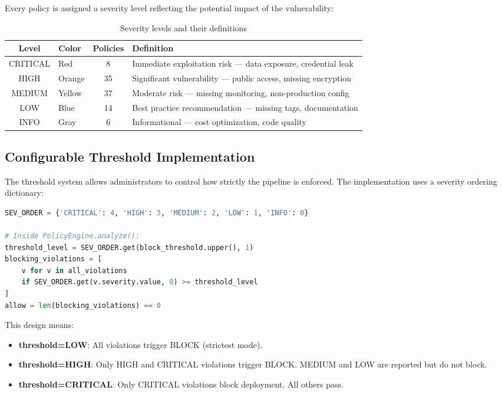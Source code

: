 Every policy is assigned a severity level reflecting the potential impact of the vulnerability:

\begin{table}[H]
\centering
\caption{Severity levels and their definitions}
\label{tab:severity-levels}
\begin{tabular}{|c|p{3cm}|c|p{6cm}|}
\hline
\textbf{Level} & \textbf{Color} & \textbf{Policies} & \textbf{Definition} \\
\hline
\cellcolor{red!20}CRITICAL & \cellcolor{red!20}Red & 8 & Immediate exploitation risk — data exposure, credential leak \\
\hline
\cellcolor{orange!20}HIGH & \cellcolor{orange!20}Orange & 35 & Significant vulnerability — public access, missing encryption \\
\hline
\cellcolor{yellow!20}MEDIUM & \cellcolor{yellow!20}Yellow & 37 & Moderate risk — missing monitoring, non-production config \\
\hline
\cellcolor{blue!10}LOW & \cellcolor{blue!10}Blue & 14 & Best practice recommendation — missing tags, documentation \\
\hline
\cellcolor{gray!10}INFO & \cellcolor{gray!10}Gray & 6 & Informational — cost optimization, code quality \\
\hline
\end{tabular}
\end{table}

\subsection{Configurable Threshold Implementation}

The threshold system allows administrators to control how strictly the pipeline is enforced. The implementation uses a severity ordering dictionary:

\begin{lstlisting}[language=Python, caption={Severity threshold filtering in PolicyEngine}, label={lst:threshold}]
SEV_ORDER = {'CRITICAL': 4, 'HIGH': 3, 'MEDIUM': 2, 'LOW': 1, 'INFO': 0}

# Inside PolicyEngine.analyze():
threshold_level = SEV_ORDER.get(block_threshold.upper(), 1)
blocking_violations = [
    v for v in all_violations
    if SEV_ORDER.get(v.severity.value, 0) >= threshold_level
]
allow = len(blocking_violations) == 0
\end{lstlisting}

\noindent This design means:
\begin{itemize}
    \item \textbf{threshold=LOW}: All violations trigger BLOCK (strictest mode).
    \item \textbf{threshold=HIGH}: Only HIGH and CRITICAL violations trigger BLOCK. MEDIUM and LOW are reported but do not block.
    \item \textbf{threshold=CRITICAL}: Only CRITICAL violations block deployment. All others pass.
\end{itemize}

